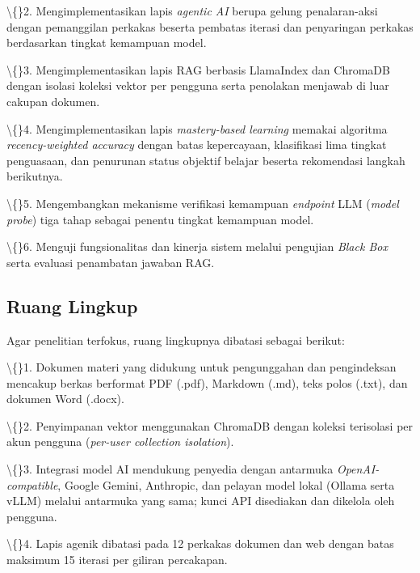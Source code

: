 \documentclass[12pt,a4paper]{article}
\begin{document}
\textbackslash\{\}2. Mengimplementasikan lapis \textit{agentic AI} berupa gelung penalaran-aksi dengan pemanggilan perkakas beserta pembatas iterasi dan penyaringan perkakas berdasarkan tingkat kemampuan model.



\textbackslash\{\}3. Mengimplementasikan lapis RAG berbasis LlamaIndex dan ChromaDB dengan isolasi koleksi vektor per pengguna serta penolakan menjawab di luar cakupan dokumen.



\textbackslash\{\}4. Mengimplementasikan lapis \textit{mastery-based learning} memakai algoritma \textit{recency-weighted accuracy} dengan batas kepercayaan, klasifikasi lima tingkat penguasaan, dan penurunan status objektif belajar beserta rekomendasi langkah berikutnya.



\textbackslash\{\}5. Mengembangkan mekanisme verifikasi kemampuan \textit{endpoint} LLM (\textit{model probe}) tiga tahap sebagai penentu tingkat kemampuan model.



\textbackslash\{\}6. Menguji fungsionalitas dan kinerja sistem melalui pengujian \textit{Black Box} serta evaluasi penambatan jawaban RAG.



\subsection*{Ruang Lingkup}

Agar penelitian terfokus, ruang lingkupnya dibatasi sebagai berikut:



\textbackslash\{\}1. Dokumen materi yang didukung untuk pengunggahan dan pengindeksan mencakup berkas berformat PDF (.pdf), Markdown (.md), teks polos (.txt), dan dokumen Word (.docx).



\textbackslash\{\}2. Penyimpanan vektor menggunakan ChromaDB dengan koleksi terisolasi per akun pengguna (\textit{per-user collection isolation}).



\textbackslash\{\}3. Integrasi model AI mendukung penyedia dengan antarmuka \textit{OpenAI-compatible}, Google Gemini, Anthropic, dan pelayan model lokal (Ollama serta vLLM) melalui antarmuka yang sama; kunci API disediakan dan dikelola oleh pengguna.



\textbackslash\{\}4. Lapis agenik dibatasi pada 12 perkakas dokumen dan web dengan batas maksimum 15 iterasi per giliran percakapan.
\end{document}
